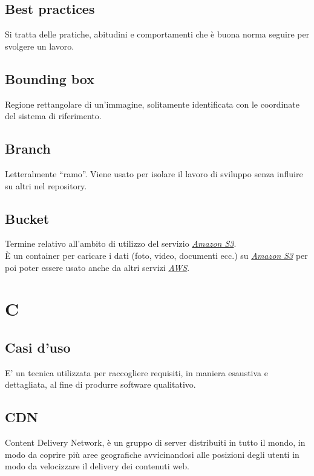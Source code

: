 \documentclass{classes/base}
\begin{document}
        \subsection*{Best practices} 
        Si tratta delle pratiche, abitudini e comportamenti che è buona norma seguire per svolgere un lavoro.

        \subsection*{Bounding box}
        Regione rettangolare di un'immagine, solitamente identificata con le coordinate del sistema di riferimento.

        \subsection*{Branch} 
        Letteralmente “ramo”. Viene usato per isolare il lavoro di sviluppo senza influire su altri nel repository. 
        
        \subsection*{Bucket}
        Termine relativo all'ambito di utilizzo del servizio \hyperref[sec:S3]{\emph{Amazon S3}}.\\
        È un container per caricare i dati (foto, video, documenti ecc.) su \hyperref[sec:S3]{\emph{Amazon S3}} per poi poter essere usato anche da altri servizi \hyperref[sec:AWS]{\emph{AWS}}. 
        
        \newpage  
    \section{C}
        \subsection*{Casi d'uso} 
        E' un tecnica utilizzata per raccogliere requisiti, in maniera esaustiva e dettagliata, al fine di produrre software qualitativo.

        \subsection*{CDN}
        Content Delivery Network, è un gruppo di server distribuiti in tutto il mondo, in modo da coprire più aree geografiche avvicinandosi alle posizioni degli utenti in modo da velocizzare il delivery dei contenuti web.
    
\end{document}
